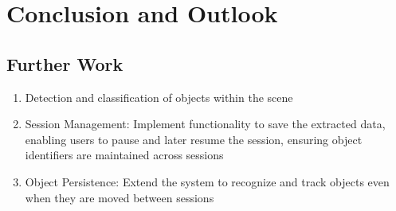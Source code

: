 \chapter{Conclusion and Outlook}

\section{Further Work}
\begin{enumerate}
    \item Detection and classification of objects within the scene
    \item Session Management: Implement functionality to save the extracted data, enabling users to pause and later resume the session, ensuring object identifiers are maintained across sessions
    \item Object Persistence: Extend the system to recognize and track objects even when they are moved between sessions
\end{enumerate}


